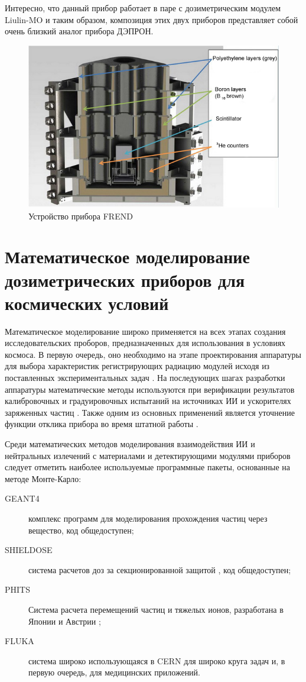 Интересно, что данный прибор работает в паре с дозиметрическим модулем Liulin-MO и таким образом, композиция этих двух приборов представляет собой очень близкий аналог прибора ДЭПРОН.
\begin{figure}
	\centering
	\includegraphics[width=0.7\linewidth]{images/frend3-eng}
	\caption{Устройство прибора FREND \cite{Mitrofanov2012}}
	\label{fig:frend3-eng}
\end{figure}

\section{Математическое моделирование дозиметрических приборов для космических условий}

Математическое моделирование широко применяется на всех этапах создания исследовательских проборов, предназначенных для использования в условиях космоса. В первую очередь, оно необходимо на этапе проектирования аппаратуры для выбора характеристик регистрирующих радиацию модулей исходя из поставленных экспериментальных задач \cite{Hassler2008}. На последующих шагах разработки аппаратуры математические методы используются при верификации результатов калибровочных и градуировочных испытаний на источниках ИИ и ускорителях заряженных частиц \cite{Zeitlin2010, Luszik-Bhadra2008} . Также одним из основных применений является уточнение функции отклика прибора во время штатной работы \cite{Zeitlin2010}. 


Среди математических методов моделирования взаимодействия ИИ и нейтральных излечений с материалами и детектирующими модулями приборов следует отметить наиболее используемые программные пакеты, основанные на методе Монте-Карло:


\begin{description}
	\item[GEANT4] комплекс программ для моделирования прохождения частиц через вещество\cite{Allison2006},  код общедоступен;
	\item[SHIELDOSE ] система расчетов доз за секционированной защитой \cite{SeltzerS.M.1980},  код общедоступен;
	\item[PHITS] Система расчета перемещений частиц и тяжелых ионов, 
	разработана в Японии и Австрии \cite{Niita2006, Sato2006} ;
	\item[FLUKA] система широко использующаяся в CERN для широко круга задач и, в первую очередь, для медицинских приложений\cite{Fasso2003, fluka2014}.
\end{description}

